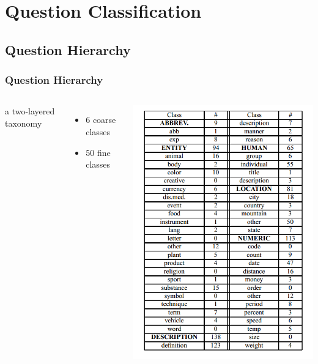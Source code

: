 \documentclass{beamer}
\begin{document}
    \section{Question Classification} %
    
    \subsection{Question Hierarchy}
    \begin{frame}
    \frametitle{Question Hierarchy}
    \begin{columns}[c]
        a two-layered taxonomy
        \begin{itemize}
            \item 6 coarse classes
            \item 50 fine classes
        \end{itemize}

        \includegraphics[scale=0.69]{1.png}

    \end{columns}
    
    \end{frame}
    
\end{document}
